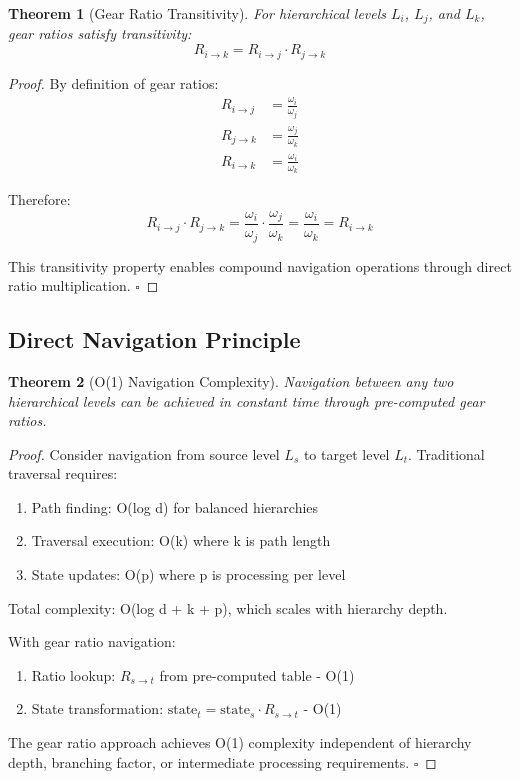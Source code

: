 \documentclass[12pt,a4paper]{article}
\newtheorem{theorem}{Theorem}
\begin{document}
\begin{theorem}[Gear Ratio Transitivity]
For hierarchical levels $L_i$, $L_j$, and $L_k$, gear ratios satisfy transitivity:
$$R_{i \to k} = R_{i \to j} \cdot R_{j \to k}$$
\end{theorem}

\begin{proof}
By definition of gear ratios:
\begin{align}
R_{i \to j} &= \frac{\omega_i}{\omega_j} \\
R_{j \to k} &= \frac{\omega_j}{\omega_k} \\
R_{i \to k} &= \frac{\omega_i}{\omega_k}
\end{align}

Therefore:
$$R_{i \to j} \cdot R_{j \to k} = \frac{\omega_i}{\omega_j} \cdot \frac{\omega_j}{\omega_k} = \frac{\omega_i}{\omega_k} = R_{i \to k}$$

This transitivity property enables compound navigation operations through direct ratio multiplication. $\square$
\end{proof}

\subsection{Direct Navigation Principle}

\begin{theorem}[O(1) Navigation Complexity]
Navigation between any two hierarchical levels can be achieved in constant time through pre-computed gear ratios.
\end{theorem}

\begin{proof}
Consider navigation from source level $L_s$ to target level $L_t$. Traditional traversal requires:
\begin{enumerate}
\item Path finding: O(log d) for balanced hierarchies
\item Traversal execution: O(k) where k is path length
\item State updates: O(p) where p is processing per level
\end{enumerate}

Total complexity: O(log d + k + p), which scales with hierarchy depth.

With gear ratio navigation:
\begin{enumerate}
\item Ratio lookup: $R_{s \to t}$ from pre-computed table - O(1)
\item State transformation: $\text{state}_t = \text{state}_s \cdot R_{s \to t}$ - O(1)
\end{enumerate}

The gear ratio approach achieves O(1) complexity independent of hierarchy depth, branching factor, or intermediate processing requirements. $\square$
\end{proof}
\end{document}
